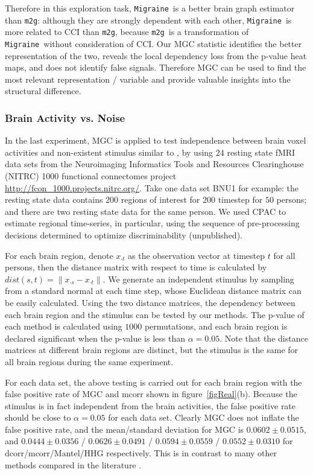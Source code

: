 \documentclass[11pt]{article}
\providecommand{\sct}[1]{{\sc \texttt{#1}}}
\newcommand{\Migraine}{\sct{Migraine}}
\newcommand{\mtg}{\sct{m2g}}
\begin{document}
Therefore in this exploration task, \Migraine~is a better brain graph estimator than \mtg: although they are strongly dependent with each other, \Migraine~is more related to CCI than \mtg, because \mtg~is a transformation of \Migraine~without consideration of CCI. Our MGC statistic identifies the better representation of the two, reveals the local dependency loss from the p-value heat maps, and does not identify false signals. Therefore MGC can be used to find the most relevant representation / variable and provide valuable insights into the structural difference.

\subsubsection{Brain Activity vs. Noise}

In the last experiment, MGC is applied to test independence between brain voxel activities and non-existent stimulus similar to \cite{EklundKnutsson2012}, by using $24$ resting state fMRI data sets from the Neuroimaging Informatics Tools and Resources Clearinghouse (NITRC) 1000 functional connectomes project \url{http://fcon_1000.projects.nitrc.org/}. Take one data set BNU1 for example: the resting state data contains $200$ regions of interest for $200$ timestep for $50$ persons; and there are 
two resting state data for the same person. We used CPAC to estimate regional time-series, in particular, using the sequence of pre-processing decisions determined to optimize discriminability (unpublished).

For each brain region, denote $x_{\cdot t}$ as the observation vector at timestep $t$ for all persons, then the distance matrix with respect to time is calculated by $dist(s,t)=\|x_{\cdot s}-x_{\cdot t}\|$. We generate an independent stimulus by sampling from a standard normal at each time step, whose Euclidean distance matrix can be easily calculated. Using the two distance matrices, the dependency between each brain region and the stimulus can be tested by our methods. The p-value of each method is calculated using $1000$ permutations, and each brain region is declared significant when the p-value is less than $\alpha=0.05$. Note that the distance matrices at different brain regions are distinct, but the stimulus is the same for all brain regions during the same experiment.

For each data set, the above testing is carried out for each brain region with the false positive rate of MGC and mcorr shown in figure~\ref{figReal}(b). Because the stimulus is in fact independent from the brain activities, the false positive rate should be close to $\alpha=0.05$ for each data set. Clearly MGC does not inflate the false positive rate, and the mean/standard deviation for MGC is $0.0602 \pm 0.0515$, and $0.0444 \pm 0.0356$ / $0.0626 \pm 0.0491$ / $0.0594 \pm 0.0559$ / $0.0552 \pm 0.0310$ for dcorr/mcorr/Mantel/HHG respectively. This is in contrast to many other methods compared in the literature \cite{EklundKnutsson2012}.
\end{document}
